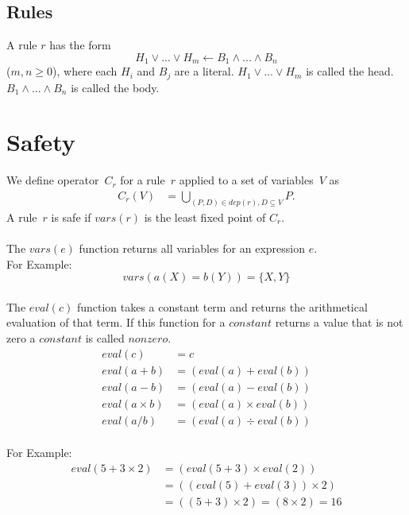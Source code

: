 \documentclass{article}
\newcommand{\set}[1]{\{#1\}}
\newcommand\Vars[1]{\mathit{vars}(#1)}
\newcommand\DP[1]{\mathit{dep}(#1)}
\newcommand\CheckOp[1]{C_{#1}}
\newcommand\CheckAp[2]{\CheckOp{#1}({#2})}
\begin{document}
	\subsection{Rules}

	A rule $r$ has the form
	\begin{equation}
		H_1 \lor ... \lor H_m  \leftarrow B_1 \land ... \land B_n 
	\end{equation}
	($m, n \ge 0$), where each $H_i$ and $B_j$ are a literal.
	$H_1 \lor ... \lor H_m$ is called the head. $B_1 \land ... \land B_n$ is called the body.

	\section{Safety}
	We define operator~$\CheckOp{r}$ for a rule~$r$ applied to a set of variables~$V$ as
	\begin{align*}
	\CheckAp{r}{V} &= \bigcup_{(P,D) \in \DP{r}, D \subseteq V} P.
	\end{align*}
	A rule~$r$ is safe if $\Vars{r}$ is the least fixed point of $\CheckOp{r}$.
	\paragraph{}
	The $\mathit{vars(e)}$ function returns all variables for an expression $e$.
	\\ For Example:
	\begin{equation*}
		vars(a(X) = b(Y)) = \set{X,Y}
	\end{equation*}
	\paragraph{}
	The $\mathit{eval(c)}$ function takes a constant term and returns the arithmetical evaluation of that term. If this function for a $\mathit{constant}$ returns a value that is not zero a $\mathit{constant}$ is called $\mathit{nonzero}$.
	\begin{align*}
		\mathit{eval(c)} &= c \\
		\mathit{eval(a + b)} &= (eval(a) + eval(b)) \\
		\mathit{eval(a - b)} &= (eval(a) - eval(b)) \\
		\mathit{eval(a \times b)} &= (eval(a) \times eval(b)) \\
		\mathit{eval(a / b)} &= (eval(a) \div eval(b))
	\end{align*}
	\\ For Example:
	\begin{align*}
		eval(5 + 3 \times 2) &= (eval(5 + 3) \times eval(2)) \\
		&= ((eval(5) + eval(3)) \times 2) \\
		&= ((5 + 3) \times 2)
		= (8 \times 2)
		= 16
	\end{align*}
\end{document}
